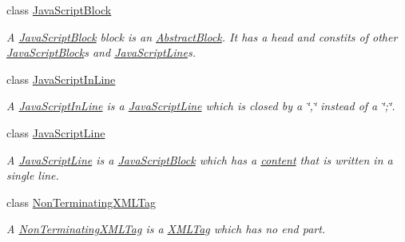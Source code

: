 \begin{DoxyCompactItemize}
class \hyperlink{class_a_rdev_kit_1_1_model_1_1_project_1_1_file_1_1_java_script_block}{Java\-Script\-Block}
\begin{DoxyCompactList}\small\item\em A \hyperlink{class_a_rdev_kit_1_1_model_1_1_project_1_1_file_1_1_java_script_block}{Java\-Script\-Block} block is an \hyperlink{class_a_rdev_kit_1_1_model_1_1_project_1_1_file_1_1_abstract_block}{Abstract\-Block}. It has a head and constits of other \hyperlink{class_a_rdev_kit_1_1_model_1_1_project_1_1_file_1_1_java_script_block}{Java\-Script\-Block}s and \hyperlink{class_a_rdev_kit_1_1_model_1_1_project_1_1_file_1_1_java_script_line}{Java\-Script\-Line}s. \end{DoxyCompactList}\item 
class \hyperlink{class_a_rdev_kit_1_1_model_1_1_project_1_1_file_1_1_java_script_in_line}{Java\-Script\-In\-Line}
\begin{DoxyCompactList}\small\item\em A \hyperlink{class_a_rdev_kit_1_1_model_1_1_project_1_1_file_1_1_java_script_in_line}{Java\-Script\-In\-Line} is a \hyperlink{class_a_rdev_kit_1_1_model_1_1_project_1_1_file_1_1_java_script_line}{Java\-Script\-Line} which is closed by a \char`\"{},\char`\"{} instead of a \char`\"{};\char`\"{}. \end{DoxyCompactList}\item 
class \hyperlink{class_a_rdev_kit_1_1_model_1_1_project_1_1_file_1_1_java_script_line}{Java\-Script\-Line}
\begin{DoxyCompactList}\small\item\em A \hyperlink{class_a_rdev_kit_1_1_model_1_1_project_1_1_file_1_1_java_script_line}{Java\-Script\-Line} is a \hyperlink{class_a_rdev_kit_1_1_model_1_1_project_1_1_file_1_1_java_script_block}{Java\-Script\-Block} which has a \hyperlink{class_a_rdev_kit_1_1_model_1_1_project_1_1_file_1_1_java_script_line_ac13eaaa9582b295e64a38594f11abb6e}{content} that is written in a single line. \end{DoxyCompactList}\item 
class \hyperlink{class_a_rdev_kit_1_1_model_1_1_project_1_1_file_1_1_non_terminating_x_m_l_tag}{Non\-Terminating\-X\-M\-L\-Tag}
\begin{DoxyCompactList}\small\item\em A \hyperlink{class_a_rdev_kit_1_1_model_1_1_project_1_1_file_1_1_non_terminating_x_m_l_tag}{Non\-Terminating\-X\-M\-L\-Tag} is a \hyperlink{class_a_rdev_kit_1_1_model_1_1_project_1_1_file_1_1_x_m_l_tag}{X\-M\-L\-Tag} which has no end part. \end{DoxyCompactList}\item 

\end{DoxyCompactItemize}
